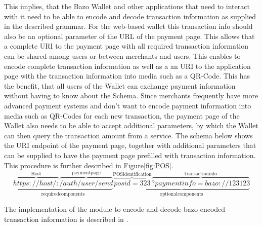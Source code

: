 This implies, that the Bazo Wallet and other applications that need to interact with it need to be able to encode and decode transaction information as supplied in the described grammar.
For the web-based wallet this transaction info should also be an optional parameter of the URL of the payment page. This allows that a complete URI to the payment page with all required transaction information can be shared among users or between merchants and users.
This enables to encode complete transaction information as well as a an URI to the application page with the transaction information into media such as a QR-Code. This has the benefit, that all users of the Wallet can exchange payment information without having to know about the Schema.
Since merchants frequently have more advanced payment systems and don't want to encode payment information into media such as QR-Codes for each new transaction, the payment page of the Wallet also needs to be able to accept additional parameters, by which the Wallet can then query the transaction amount from a service.
The schema below shows the URI endpoint of the payment page, together with additional parameters that can be supplied to have the payment page prefilled with transaction information. This procedure is further described in Figure\ref{fig:POS}.
\[
\underbrace{\overbrace{https://host/:}^{\mathrm{Host}}\overbrace{/auth/user/send}^{\mathrm{payment page}}}_{\mathrm{required components}}
\underbrace{\overbrace{posid=323}^{\mathrm{POS identification}}\overbrace{?paymentinfo=bazo://123123}^{\mathrm{transaction info}}}_{\mathrm{optional components}}
\]

The implementation of the module to encode and decode bazo encoded transaction information is described in \cite{undefined}.

